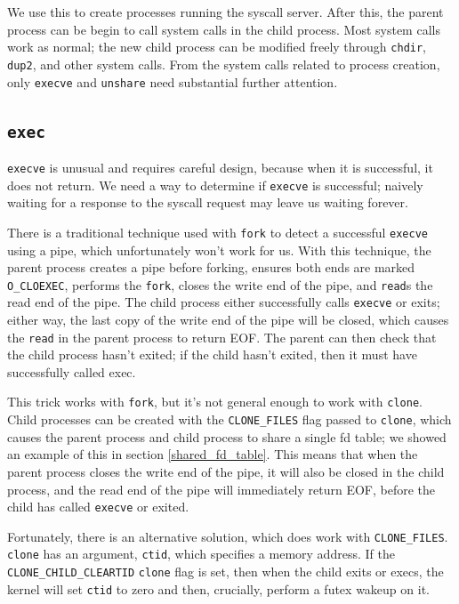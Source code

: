 \documentclass[letterpaper,twocolumn,10pt]{article}
\begin{document}
We use this to create processes running the syscall server.
After this,
the parent process can be begin to call system calls in the child process.
Most system calls work as normal;
the new child process can be modified freely through \texttt{chdir}, \texttt{dup2}, and other system calls.
From the system calls related to process creation,
only \texttt{execve} and \texttt{unshare} need substantial further attention.
\subsection{\texttt{exec}}\label{execve}
\texttt{execve} is unusual and requires careful design,
because when it is successful, it does not return.
We need a way to determine if \texttt{execve} is successful;
naively waiting for a response to the syscall request may leave us waiting forever.

There is a traditional technique used with \texttt{fork}
to detect a successful \texttt{execve} using a pipe,
which unfortunately won't work for us.
With this technique, the parent process creates a pipe before forking,
ensures both ends are marked \verb|O_CLOEXEC|,
performs the \texttt{fork},
closes the write end of the pipe,
and \texttt{read}s the read end of the pipe.
The child process either successfully calls \texttt{execve} or exits;
either way, the last copy of the write end of the pipe will be closed,
which causes the \texttt{read} in the parent process to return EOF.
The parent can then check that the child process hasn't exited;
if the child hasn't exited, then it must have successfully called exec.

This trick works with \texttt{fork},
but it's not general enough to work with \texttt{clone}.
Child processes can be created with the \verb|CLONE_FILES| flag passed to \texttt{clone},
which causes the parent process and child process to share a single fd table;
we showed an example of this in section \ref{shared_fd_table}.
This means that when the parent process closes the write end of the pipe,
it will also be closed in the child process,
and the read end of the pipe will immediately return EOF,
before the child has called \texttt{execve} or exited.

Fortunately, there is an alternative solution, which does work with \verb|CLONE_FILES|.
\texttt{clone} has an argument, \texttt{ctid}, which specifies a memory address.
If the \verb|CLONE_CHILD_CLEARTID| \texttt{clone} flag is set,
then when the child exits or execs,
the kernel will set \texttt{ctid} to zero and then,
crucially, perform a futex wakeup on it.\cite{clone}
\end{document}
